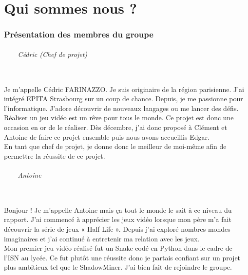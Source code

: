 \documentclass[titlepage, 13px, a4paper]{report}
\begin{document}


\newpage


\part{Qui sommes nous ?}
\section{Présentation des membres du groupe}

\paragraph{~~~~Cédric (Chef de projet)} \hspace{0pt} \\
Je m’appelle Cédric FARINAZZO. Je suis originaire de la région parisienne. 
J’ai intégré EPITA Strasbourg sur un coup de chance. Depuis, je me passionne pour l’informatique. 
J’adore découvrir de nouveaux langages ou me lancer des défis. \\
Réaliser un jeu vidéo est un rêve pour tous le monde. Ce projet est donc une occasion en or de le réaliser. 
Dès décembre, j’ai donc proposé à Clément et Antoine de faire ce projet ensemble puis nous avons accueillis Edgar. \\
En tant que chef de projet, je donne donc le meilleur de moi-même afin de permettre la réussite de ce projet. \\


\paragraph{~~~~Antoine} \hspace{0pt} \\
Bonjour ! Je m'appelle Antoine mais ça tout le monde le sait à ce niveau du rapport.  
J'ai commencé à apprécier les jeux vidéo lorsque mon père m'a fait découvrir la série de 
jeux « Half-Life ». Depuis j'ai exploré nombres mondes imaginaires et j'ai continué à 
entretenir ma relation avec les jeux. \\
Mon premier jeu vidéo réalisé fut un Snake codé 
en Python dans le cadre de l'ISN au lycée. Ce fut plutôt une réussite donc je partais 
confiant sur un projet plus ambitieux tel que le ShadowMiner. J'ai bien fait de rejoindre le groupe. \\
\end{document}
